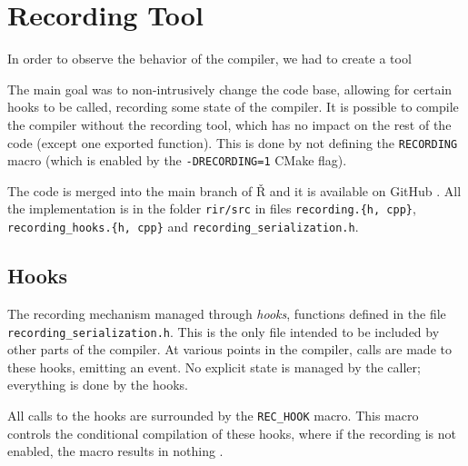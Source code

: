 \chapter{Recording Tool}

\begin{chapterabstract}
	\todoadd
\end{chapterabstract}

In order to observe the behavior of the compiler, we had to create a tool

The main goal was to non-intrusively change the code base, allowing for certain hooks to be called, recording some state of the compiler. It is possible to compile the compiler without the recording tool, which has no impact on the rest of the code (except one exported function). This is done by not defining the \texttt{RECORDING} macro (which is enabled by the \texttt{-DRECORDING=1} CMake flag).

The code is merged into the main branch of Ř and it is available on GitHub \todoadd. All the implementation is in the folder \texttt{rir/src} in files \texttt{recording.\{h, cpp\}}, \texttt{recording\_hooks.\{h, cpp\}} and \texttt{recording\_serialization.h}.


\section{Hooks}

The recording mechanism managed through \textit{ hooks}, functions defined in the file \texttt{recording\_serialization.h}. This is the only file intended to be included by other parts of the compiler. At various points in the compiler, calls are made to these hooks, emitting an event. No explicit state is managed by the caller; everything is done by the hooks.

All calls to the hooks are surrounded by the \texttt{REC\_HOOK} macro. This macro controls the conditional compilation of these hooks, where if the recording is not enabled, the macro results in nothing .

